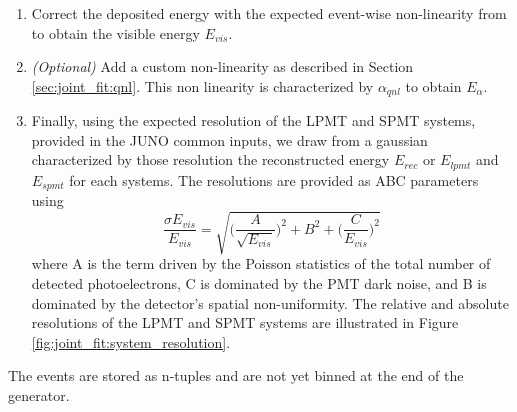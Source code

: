 \documentclass[../main.tex]{subfiles}
\begin{document}
\begin{enumerate}
  \item Correct the deposited energy with the expected event-wise non-linearity from \cite{juno_collaboration_calibration_2021} to obtain the visible energy $E_{vis}$.
  \item \textit{(Optional)} Add a custom non-linearity as described in Section \ref{sec:joint_fit:qnl}. This non linearity is characterized by $\alpha_{qnl}$ to obtain $E_{\alpha}$.
  \item Finally, using the expected resolution of the LPMT and SPMT systems,  provided in the JUNO common inputs, we draw from a gaussian characterized by those resolution the reconstructed energy $E_{rec}$ or $E_{lpmt}$ and $E_{spmt}$ for each systems. The resolutions are provided as ABC parameters using
    \begin{equation}
      \label{eq:joint_fit:abc}
      \frac{\sigma E_{vis}}{E_{vis}} = \sqrt{\bigg(\frac{A}{\sqrt{E_{vis}}}\bigg)^2 + B^2 + \bigg(\frac{C}{E_{vis}}\bigg)^2}
    \end{equation}
    where A is the term driven by the Poisson statistics of the total number of detected photoelectrons, C is dominated by the PMT dark noise, and B is dominated by the detector's spatial non-uniformity. The relative and absolute resolutions of the LPMT and SPMT systems are illustrated in Figure \ref{fig:joint_fit:system_resolution}.
\end{enumerate}

The events are stored as n-tuples and are not yet binned at the end of the generator.
\end{document}
